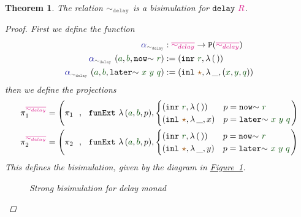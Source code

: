 \documentclass[twoside,11pt,openright]{report}
\theoremstyle{plain} %
\newtheorem{thm}{Theorem}[section]
\theoremstyle{definition}
\theoremstyle{remark}
\newcommand*{\figref}[1]{\hyperref[fig:#1]{Figure~\ref*{fig:#1}}}
\newcommand*{\term}[1]{\textcolor{green!30!black}{#1}} %
\newcommand*{\type}[1]{\textcolor{magenta!90!black}{#1}}
\newcommand*{\coalg}[2]{#1\texttt{-}#2}
\newcommand*{\relation}[1]{\textcolor{gray!75!black}{\ensuremath{\mathtt{#1}}}}
\newcommand*{\constant}[1]{\textcolor{orange!60!black}{\ensuremath{\mathtt{#1}}}}
\newcommand*{\function}[1]{\textcolor{blue!60!black}{\ensuremath{\mathtt{#1}}}}
\newcommand*{\typeformer}[1]{\ensuremath{\mathtt{#1}}}
\newcommand*{\functor}[1]{\ensuremath{\mathbf{\mathtt{#1}}}}
\newcommand*{\unitelem}{\constant{\star}} %
\begin{document}
\begin{thm}
  The relation \(\relation{\sim_{delay}}\) is a bisimulation for \(\typeformer{delay}~\type{R}\).
  \begin{proof}
    First we define the function
    \begin{equation}
      \begin{aligned}
        \function{\alpha}_{\relation{\sim_{delay}}} &: \type{\overline{\sim_{delay}}} \rightarrow \functor{P} (\type{\overline{\sim_{delay}}}) \\
        \function{\alpha}_{\relation{\sim_{delay}}}~(\term{a} , \term{b} , \mathtt{now}{\sim}~\term{r}) &:= (\mathtt{inr}~\term{r} , \lambda\,(\,)) \\
        \function{\alpha}_{\relation{\sim_{delay}}}~(\term{a} , \term{b} , \mathtt{later}{\sim}~\term{x}~\term{y}~\term{q}) &:= (\mathtt{inl}~\unitelem , \lambda\,\_, (\term{x} , \term{y} , \term{q}))
      \end{aligned}
    \end{equation}
    then we define the projections
      \begin{align}
        \pi_1^{\type{\overline{\sim_{delay}}}} &= \left( \pi_1 ~~ , ~~ \texttt{funExt}~\lambda\,(\term{a},\term{b},p), \begin{cases} (\mathtt{inr}~\term{r} , \lambda\,(\,)) & p = \mathtt{now}{\sim}~\term{r} \\ (\mathtt{inl}~\unitelem , \lambda\,\_, x) & p = \mathtt{later}{\sim}~\term{x}~\term{y}~\term{q}\end{cases} \right) \\
        \pi_2^{\type{\overline{\sim_{delay}}}} &= \left( \pi_2 ~~ , ~~ \texttt{funExt}~\lambda\,(\term{a},\term{b},p), \begin{cases} (\mathtt{inr}~\term{r} , \lambda\,(\,)) & p = \mathtt{now}{\sim}~\term{r} \\ (\mathtt{inl}~\unitelem , \lambda\,\_, y) & p = \mathtt{later}{\sim}~\term{x}~\term{y}~\term{q}\end{cases} \right) \\
      \end{align}
      This defines the bisimulation, given by the diagram in \figref{delay-strong-bisim}.
      \begin{figure}[h]
        \centering
        \caption{Strong bisimulation for delay monad}
        \label{fig:delay-strong-bisim}
      \end{figure}
  \end{proof}
\end{thm}
\end{document}

